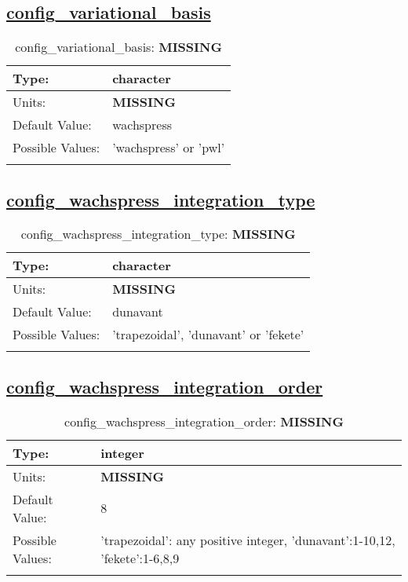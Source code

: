 \subsection[config\_variational\_basis]{\hyperref[sec:nm_tab_velocity_solver]{config\_variational\_basis}}
\label{subsec:nm_sec_config_variational_basis}
\begin{center}
\begin{longtable}{| p{2.0in} || p{4.0in} |}
    \hline
    Type: & character \\
    \hline
    Units: & {\bf \color{red} MISSING} \\
    \hline
    Default Value: & wachspress \\
    \hline
    Possible Values: & 'wachspress' or 'pwl' \\
    \hline
    \caption{config\_variational\_basis: {\bf \color{red} MISSING}}
\end{longtable}
\end{center}
\subsection[config\_wachspress\_integration\_type]{\hyperref[sec:nm_tab_velocity_solver]{config\_wachspress\_integration\_type}}
\label{subsec:nm_sec_config_wachspress_integration_type}
\begin{center}
\begin{longtable}{| p{2.0in} || p{4.0in} |}
    \hline
    Type: & character \\
    \hline
    Units: & {\bf \color{red} MISSING} \\
    \hline
    Default Value: & dunavant \\
    \hline
    Possible Values: & 'trapezoidal', 'dunavant' or 'fekete' \\
    \hline
    \caption{config\_wachspress\_integration\_type: {\bf \color{red} MISSING}}
\end{longtable}
\end{center}
\subsection[config\_wachspress\_integration\_order]{\hyperref[sec:nm_tab_velocity_solver]{config\_wachspress\_integration\_order}}
\label{subsec:nm_sec_config_wachspress_integration_order}
\begin{center}
\begin{longtable}{| p{2.0in} || p{4.0in} |}
    \hline
    Type: & integer \\
    \hline
    Units: & {\bf \color{red} MISSING} \\
    \hline
    Default Value: & 8 \\
    \hline
    Possible Values: & 'trapezoidal': any positive integer, 'dunavant':1-10,12, 'fekete':1-6,8,9 \\
    \hline
    \caption{config\_wachspress\_integration\_order: {\bf \color{red} MISSING}}
\end{longtable}
\end{center}
